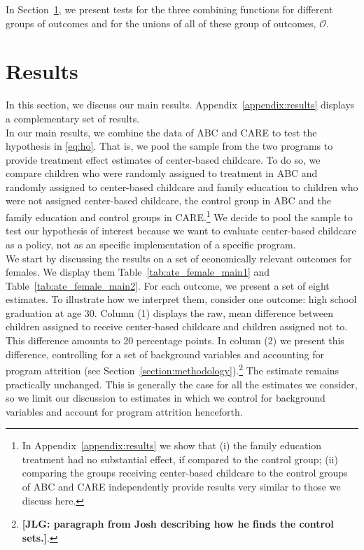 \noindent In Section~\ref{section:results}, we present tests for the three combining functions for different groups of outcomes and for the unions of all of these group of outcomes, $\mathcal{O}$.

\section{Results} \label{section:results}

\noindent In this section, we discuss our main results. Appendix~\ref{appendix:results} displays a complementary set of results.\\

\noindent In our main results, we combine the data of ABC and CARE to test the hypothesis in \eqref{eq:ho}. That is, we pool the sample from the two programs to provide treatment effect estimates of center-based childcare. To do so, we compare children who were randomly assigned to treatment in ABC and randomly assigned to center-based childcare and family education to children who were not assigned center-based childcare, the control group in ABC and the family education and control groups in CARE.\footnote{In Appendix~\ref{appendix:results} we show that (i) the family education treatment had no substantial effect, if compared to the control group; (ii) comparing the groups receiving center-based childcare to the control groups of ABC and CARE independently provide results very similar to those we discuss here.} We decide to pool the sample to test our hypothesis of interest because we want to evaluate center-based childcare as a policy, not as an specific implementation of a specific program.\\

\noindent We start by discussing the results on a set of economically relevant outcomes for females. We display them Table~\ref{tab:ate_female_main1} and Table~\ref{tab:ate_female_main2}. For each outcome, we present a set of eight estimates. To illustrate how we interpret them, consider one outcome: high school graduation at age 30. Column (1) displays the raw, mean difference between children assigned to receive center-based childcare and children assigned not to. This difference amounts to 20 percentage points. In column (2) we present this difference, controlling for a set of background variables and accounting for program attrition (see Section~\ref{section:methodology}).\footnote{\textbf{[JLG: paragraph from Josh describing how he finds the control sets.]}.} The estimate remains practically unchanged. This is generally the case for all the estimates we consider, so we limit our discussion to estimates in which we control for background variables and account for program attrition henceforth.\\


